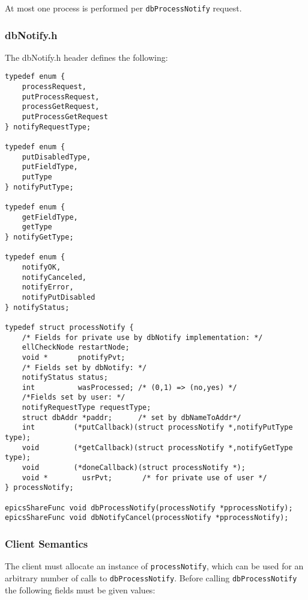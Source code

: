 At most one process is performed per \verb|dbProcessNotify| request.

\subsubsection{dbNotify.h}

The dbNotify.h header defines the following:

\begin{verbatim}
typedef enum {
    processRequest,
    putProcessRequest,
    processGetRequest,
    putProcessGetRequest
} notifyRequestType;

typedef enum {
    putDisabledType,
    putFieldType,
    putType
} notifyPutType;

typedef enum {
    getFieldType,
    getType
} notifyGetType;

typedef enum {
    notifyOK,
    notifyCanceled,
    notifyError,
    notifyPutDisabled
} notifyStatus;

typedef struct processNotify {
    /* Fields for private use by dbNotify implementation: */
    ellCheckNode restartNode;
    void *       pnotifyPvt;
    /* Fields set by dbNotify: */
    notifyStatus status;
    int          wasProcessed; /* (0,1) => (no,yes) */
    /*Fields set by user: */
    notifyRequestType requestType;
    struct dbAddr *paddr;      /* set by dbNameToAddr*/
    int         (*putCallback)(struct processNotify *,notifyPutType type);
    void        (*getCallback)(struct processNotify *,notifyGetType type);
    void        (*doneCallback)(struct processNotify *);
    void *        usrPvt;       /* for private use of user */
} processNotify;

epicsShareFunc void dbProcessNotify(processNotify *pprocessNotify);
epicsShareFunc void dbNotifyCancel(processNotify *pprocessNotify);
\end{verbatim}

\subsubsection{Client Semantics}

The client must allocate an instance of \verb|processNotify|, which can be used for an arbitrary number of calls to \verb|dbProcessNotify|.
Before calling \verb|dbProcessNotify| the following fields must be given values:

